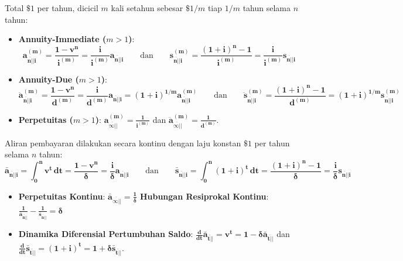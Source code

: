 \documentclass[10pt,a4paper]{article}
\newcommand{\angl}[1]{\overline{#1|}}
\begin{document}
\begin{rumusbox}
Total $\$1$ per tahun, dicicil $m$ kali setahun sebesar $\$1/m$ tiap $1/m$ tahun selama $n$ tahun:
\begin{itemize}[leftmargin=1.5em, topsep=1.5pt, itemsep=2pt]
    \item \textbf{Annuity-Immediate ($m > 1$)}:
    \begin{equation*}
        \mathbf{a_{\angl{n}|i}^{(m)} = \frac{1 - v^n}{i^{(m)}} = \frac{i}{i^{(m)}} a_{\angl{n}|i}} \qquad\text{dan}\qquad \mathbf{s_{\angl{n}|i}^{(m)} = \frac{(1+i)^n - 1}{i^{(m)}} = \frac{i}{i^{(m)}} s_{\angl{n}|i}}
    \end{equation*}
    \item \textbf{Annuity-Due ($m > 1$)}:
    \begin{equation*}
        \mathbf{\ddot{a}_{\angl{n}|i}^{(m)} = \frac{1 - v^n}{d^{(m)}} = \frac{i}{d^{(m)}} a_{\angl{n}|i} = (1+i)^{1/m} a_{\angl{n}|i}^{(m)}} \qquad\text{dan}\qquad \mathbf{\ddot{s}_{\angl{n}|i}^{(m)} = \frac{(1+i)^n - 1}{d^{(m)}} = (1+i)^{1/m} s_{\angl{n}|i}^{(m)}}
    \end{equation*}
    \item \textbf{Perpetuitas ($m > 1$)}: $\mathbf{a_{\angl{\infty}|}^{(m)} = \frac{1}{i^{(m)}}}$ \qquad dan \qquad $\mathbf{\ddot{a}_{\angl{\infty}|}^{(m)} = \frac{1}{d^{(m)}}}$.
\end{itemize}
\end{rumusbox}

\begin{teoremabox}
Aliran pembayaran dilakukan secara kontinu dengan laju konstan $\$1$ per tahun selama $n$ tahun:
\begin{equation*}
    \mathbf{\bar{a}_{\angl{n}|i} = \int_0^n v^t \, dt = \frac{1 - v^n}{\delta} = \frac{i}{\delta} a_{\angl{n}|i}} \qquad\text{dan}\qquad \mathbf{\bar{s}_{\angl{n}|i} = \int_0^n (1+i)^t \, dt = \frac{(1+i)^n - 1}{\delta} = \frac{i}{\delta} s_{\angl{n}|i}}
\end{equation*}
\begin{itemize}[leftmargin=1.5em, topsep=1pt, itemsep=1.5pt]
    \item \textbf{Perpetuitas Kontinu}: $\mathbf{\bar{a}_{\angl{\infty}|} = \frac{1}{\delta}}$ \qquad\textbf{Hubungan Resiprokal Kontinu}: $\mathbf{\frac{1}{\bar{a}_{\angl{n}|}} - \frac{1}{\bar{s}_{\angl{n}|}} = \delta}$
    \item \textbf{Dinamika Diferensial Pertumbuhan Saldo}: $\mathbf{\frac{d}{dt} \bar{a}_{\angl{t}|} = v^t = 1 - \delta \bar{a}_{\angl{t}|}}$ \quad dan \quad $\mathbf{\frac{d}{dt} \bar{s}_{\angl{t}|} = (1+i)^t = 1 + \delta \bar{s}_{\angl{t}|}}$.
\end{itemize}
\end{teoremabox}
\end{document}
